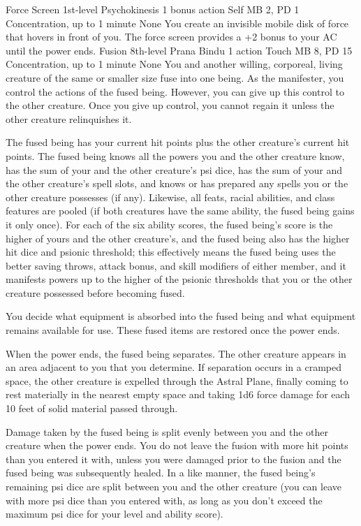 \DndPowerHeader%
    {Force Screen\label{pwr:force-screen}}
    {1st-level Psychokinesis}
    {1 bonus action}
    {Self}
    {MB 2, PD 1}
    {Concentration, up to 1 minute}
    {None}
You create an invisible mobile disk of force
that hovers in front of you. The force screen provides a +2
bonus to your AC until the power ends.
\DndPowerHeader%
    {Fusion\label{pwr:fusion}}
    {8th-level Prana Bindu}
    {1 action}
    {Touch}
    {MB 8, PD 15}
    {Concentration, up to 1 minute}
    {None}
You and another willing, corporeal, living
creature of the same or smaller size fuse into one being.
As the manifester, you control the actions of the fused being.
However, you can give up this control to the other creature.
Once you give up control, you cannot regain it unless the
other creature relinquishes it.

The fused being has your current hit points plus the other
creature's current hit points. The fused being knows all
the powers you and the other creature know, has the sum of
your and the other creature's psi dice, has the sum of your
and the other creature's spell slots, and knows or has prepared
any spells you or the other creature possesses (if any). Likewise,
all feats, racial abilities, and class features are pooled
(if both creatures have the same ability, the fused being
gains it only once). For each of the six ability scores, the
fused being's score is the higher of yours and the other
creature's, and the fused being also has the higher hit dice
and psionic threshold; this effectively means the fused being
uses the better saving throws, attack bonus, and skill modifiers
of either member, and it manifests powers up to the higher
of the psionic thresholds that you or the other creature possessed
before becoming fused.

You decide what equipment is absorbed into the fused being
and what equipment remains available for use. These fused
items are restored once the power ends.

When the power ends, the fused being separates. The other
creature appears in an area adjacent to you that you determine.
If separation occurs in a cramped space, the other creature
is expelled through the Astral Plane, finally coming to rest
materially in the nearest empty space and taking 1d6 force
damage for each 10 feet of solid material passed through.

Damage taken by the fused being is split evenly between you
and the other creature when the power ends. You do not leave
the fusion with more hit points than you entered it with,
unless you were damaged prior to the fusion and the fused
being was subsequently healed. In a like manner, the fused
being's remaining psi dice are split between you and
the other creature (you can leave with more psi dice than you
entered with, as long as you don't exceed the maximum psi dice
for your level and ability score).

